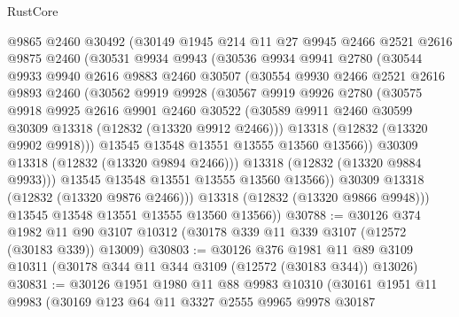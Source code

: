 \begin{lexlean}{RustCore}
\begin{coremodule}
          @9865
          @2460
          @30492
          (@30149
            @1945
            @214
            @11
            @27
            @9945
            @2466
            @2521
            @2616
            @9875
            @2460
            (@30531
              @9934
              @9943
              (@30536
                @9934
                @9941
                @2780
                (@30544
                  @9933
                  @9940
                  @2616
                  @9883
                  @2460
                  @30507
                  (@30554
                    @9930
                    @2466
                    @2521
                    @2616
                    @9893
                    @2460
                    (@30562
                      @9919
                      @9928
                      (@30567
                        @9919
                        @9926
                        @2780
                        (@30575
                          @9918
                          @9925
                          @2616
                          @9901
                          @2460
                          @30522
                          (@30589 @9911 @2460 @30599 @30309 @13318 (@12832 (@13320 @9912 @2466)))
                          @13318
                          (@12832 (@13320 @9902 @9918)))
                        @13545
                        @13548
                        @13551
                        @13555
                        @13560
                        @13566))
                    @30309
                    @13318
                    (@12832 (@13320 @9894 @2466)))
                  @13318
                  (@12832 (@13320 @9884 @9933)))
                @13545
                @13548
                @13551
                @13555
                @13560
                @13566))
            @30309
            @13318
            (@12832 (@13320 @9876 @2466)))
          @13318
          (@12832 (@13320 @9866 @9948)))
        @13545
        @13548
        @13551
        @13555
        @13560
        @13566))
@30788 := @30126
    @374
    @1982
    @11
    @90
    @3107
    @10312
    (@30178 @339 @11 @339 @3107 (@12572 (@30183 @339)) @13009)
@30803 := @30126
    @376
    @1981
    @11
    @89
    @3109
    @10311
    (@30178 @344 @11 @344 @3109 (@12572 (@30183 @344)) @13026)
@30831 := @30126
    @1951
    @1980
    @11
    @88
    @9983
    @10310
    (@30161
      @1951
      @11
      @9983
      (@30169
        @123
        @64
        @11
        @3327
        @2555
        @9965
        @9978
        @30187

\end{coremodule}
\end{lexlean}
